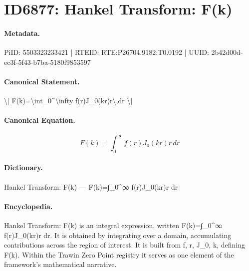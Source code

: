\section*{ID6877: Hankel Transform: F(k)}
\paragraph{Metadata.}
PiID: 5503323233421 | RTEID: RTE:P26704.9182:T0.0192 | UUID: 2b42d00d-ec3f-5f43-b7ba-5180f9853597

\paragraph{Canonical Statement.}
\textbackslash{}[ F(k)=\textbackslash{}int\_0\textasciicircum{}\textbackslash{}infty f(r)J\_0(kr)r\textbackslash{},dr \textbackslash{}]

\paragraph{Canonical Equation.}
\[
F(k)=\int_0^\infty f(r)J_0(kr)r\,dr
\]

\paragraph{Dictionary.}
Hankel Transform: F(k) — F(k)=∫\_0\textasciicircum{}∞ f(r)J\_0(kr)r dr

\paragraph{Encyclopedia.}
Hankel Transform: F(k) is an integral expression, written F(k)=∫\_0\textasciicircum{}∞ f(r)J\_0(kr)r dr. It is obtained by integrating over a domain, accumulating contributions across the region of interest. It is built from f, r, J\_0, k, defining F(k). Within the Trawin Zero Point registry it serves as one element of the framework's mathematical narrative.
